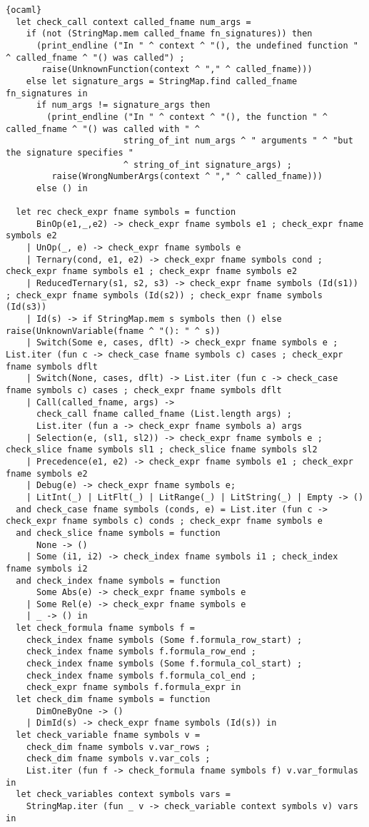 \begin{lstlisting}{ocaml}
  let check_call context called_fname num_args =
    if (not (StringMap.mem called_fname fn_signatures)) then
      (print_endline ("In " ^ context ^ "(), the undefined function " ^ called_fname ^ "() was called") ;
       raise(UnknownFunction(context ^ "," ^ called_fname)))
    else let signature_args = StringMap.find called_fname fn_signatures in
      if num_args != signature_args then
        (print_endline ("In " ^ context ^ "(), the function " ^ called_fname ^ "() was called with " ^
                       string_of_int num_args ^ " arguments " ^ "but the signature specifies "
                       ^ string_of_int signature_args) ;
         raise(WrongNumberArgs(context ^ "," ^ called_fname)))
      else () in

  let rec check_expr fname symbols = function
      BinOp(e1,_,e2) -> check_expr fname symbols e1 ; check_expr fname symbols e2
    | UnOp(_, e) -> check_expr fname symbols e
    | Ternary(cond, e1, e2) -> check_expr fname symbols cond ; check_expr fname symbols e1 ; check_expr fname symbols e2
    | ReducedTernary(s1, s2, s3) -> check_expr fname symbols (Id(s1)) ; check_expr fname symbols (Id(s2)) ; check_expr fname symbols (Id(s3))
    | Id(s) -> if StringMap.mem s symbols then () else raise(UnknownVariable(fname ^ "(): " ^ s))
    | Switch(Some e, cases, dflt) -> check_expr fname symbols e ; List.iter (fun c -> check_case fname symbols c) cases ; check_expr fname symbols dflt
    | Switch(None, cases, dflt) -> List.iter (fun c -> check_case fname symbols c) cases ; check_expr fname symbols dflt
    | Call(called_fname, args) ->
      check_call fname called_fname (List.length args) ;
      List.iter (fun a -> check_expr fname symbols a) args
    | Selection(e, (sl1, sl2)) -> check_expr fname symbols e ; check_slice fname symbols sl1 ; check_slice fname symbols sl2
    | Precedence(e1, e2) -> check_expr fname symbols e1 ; check_expr fname symbols e2
    | Debug(e) -> check_expr fname symbols e;
    | LitInt(_) | LitFlt(_) | LitRange(_) | LitString(_) | Empty -> ()
  and check_case fname symbols (conds, e) = List.iter (fun c -> check_expr fname symbols c) conds ; check_expr fname symbols e
  and check_slice fname symbols = function
      None -> ()
    | Some (i1, i2) -> check_index fname symbols i1 ; check_index fname symbols i2
  and check_index fname symbols = function
      Some Abs(e) -> check_expr fname symbols e
    | Some Rel(e) -> check_expr fname symbols e
    | _ -> () in
  let check_formula fname symbols f =
    check_index fname symbols (Some f.formula_row_start) ;
    check_index fname symbols f.formula_row_end ;
    check_index fname symbols (Some f.formula_col_start) ;
    check_index fname symbols f.formula_col_end ;
    check_expr fname symbols f.formula_expr in
  let check_dim fname symbols = function
      DimOneByOne -> ()
    | DimId(s) -> check_expr fname symbols (Id(s)) in
  let check_variable fname symbols v =
    check_dim fname symbols v.var_rows ;
    check_dim fname symbols v.var_cols ;
    List.iter (fun f -> check_formula fname symbols f) v.var_formulas in
  let check_variables context symbols vars =
    StringMap.iter (fun _ v -> check_variable context symbols v) vars in


\end{lstlisting}
